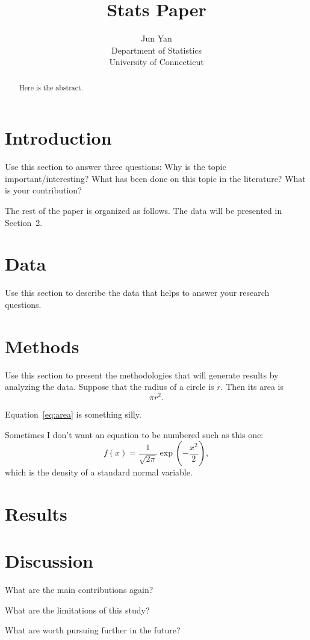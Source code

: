 \documentclass[12pt]{article}
\title{Stats Paper}
\author{Jun Yan\\
  Department of Statistics\\
  University of Connecticut
}
\begin{document}
\maketitle

\begin{abstract}
Here is the abstract.  
\end{abstract}


\section{Introduction}
\label{sec:intro}

Use this section to answer three questions:
Why is the topic important/interesting?
What has been done on this topic in the literature?
What is your contribution?


The rest of the paper is organized as follows.
The data will be presented in Section~2.


\section{Data}
\label{sec:data}

Use this section to describe the data that helps to answer your research questions.

\section{Methods}
\label{sec:meth}

Use this section to present the methodologies that will generate results by
analyzing the data. Suppose that the radius of a circle is $r$. Then its area is
\begin{equation}
  \label{eq:area}
  \pi r^2.
\end{equation}

Equation~\eqref{eq:area} is something silly.

Sometimes I don't want an equation to be numbered such as this one:
\[
  f(x) = \frac{1}{\sqrt{2\pi}} \exp\left( - \frac{x^2}{2} \right),
\]
which is the density of a standard normal variable.


\section{Results}
\label{sec:results}


\section{Discussion}
\label{sec:disc}

What are the main contributions again?

What are the limitations of this study?

What are worth pursuing further in the future?
\end{document}
